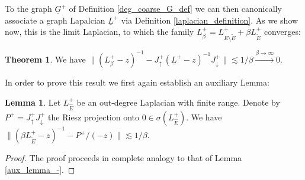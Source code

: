 \documentclass[reqno,12pt,letterpaper]{amsart}
\numberwithin{equation}{section}
\newcommand{\Lout}{L^{+}}
\newcommand{\1}{\mathds{1}}
\theoremstyle{definition}
\newtheorem{Thm}[Th]{Theorem}
\newtheorem{Lem}[Th]{Lemma}
\begin{document}
	To the graph $\underline{G}^+$ of Definition \ref{deg_coarse_G_def} we can then canonically associate a graph Lapalcian $\underline{L}^+$ via  Definition \ref{laplacian_definition}. As we show now, this is the limit Laplacian, to which the family $\Lout_\beta = \Lout_{E \setminus \tilde{E}} + \beta \Lout_{\tilde{E}}$ converges:
	\begin{Thm}\label{+_conv_theorem}
		We have
$
			\| (\Lout_\beta - z)^{-1} - J^+_{\uparrow} (\underline{L}^+ -z)^{-1}  J^+_\downarrow \|
			\lesssim 1/\beta \xrightarrow{\beta \rightarrow \infty} 0.
$
	\end{Thm}
	In order to prove this result we first again establish an auxiliary Lemma:
	\begin{Lem}\label{aux_lemma_+}
		Let $\Lout_{\hat{E}}$	be an out-degree Laplacian with finite range. Denote by $P^+ = J^+_\uparrow J^+_\downarrow$ the Riesz projection onto $0 \in \sigma(\Lout_{\hat{E}})$. We have
$
			\|  (\beta \Lout_{\tilde{E}} - z)^{-1} - P^+/(-z)  \| \lesssim 1/\beta.
	$
	\end{Lem}
	\begin{proof} The proof proceeds in complete analogy to that of Lemma \ref{aux_lemma_-}.
	\end{proof}
	 
	
	
	
	
	
	
\end{document}
